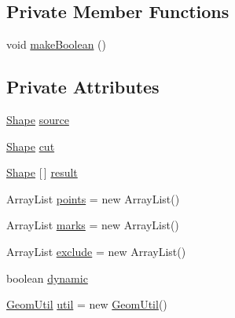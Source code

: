 \subsection*{Private Member Functions}
\begin{DoxyCompactItemize}
\item 
void \mbox{\hyperlink{classorg_1_1newdawn_1_1slick_1_1tests_1_1_geom_util_test_a8e0c0356060376434cac5a5740a2ad01}{make\+Boolean}} ()
\end{DoxyCompactItemize}
\subsection*{Private Attributes}
\begin{DoxyCompactItemize}
\item 
\mbox{\hyperlink{classorg_1_1newdawn_1_1slick_1_1geom_1_1_shape}{Shape}} \mbox{\hyperlink{classorg_1_1newdawn_1_1slick_1_1tests_1_1_geom_util_test_a608f7ccfa180e1e71c5939b8ef38c1fa}{source}}
\item 
\mbox{\hyperlink{classorg_1_1newdawn_1_1slick_1_1geom_1_1_shape}{Shape}} \mbox{\hyperlink{classorg_1_1newdawn_1_1slick_1_1tests_1_1_geom_util_test_abb232621689f77335ad9a620f991adf8}{cut}}
\item 
\mbox{\hyperlink{classorg_1_1newdawn_1_1slick_1_1geom_1_1_shape}{Shape}} \mbox{[}$\,$\mbox{]} \mbox{\hyperlink{classorg_1_1newdawn_1_1slick_1_1tests_1_1_geom_util_test_af4ae92e561e02a091075109486da4a61}{result}}
\item 
Array\+List \mbox{\hyperlink{classorg_1_1newdawn_1_1slick_1_1tests_1_1_geom_util_test_ac17af1067ad6fc4f5e0d55ba2e6435d5}{points}} = new Array\+List()
\item 
Array\+List \mbox{\hyperlink{classorg_1_1newdawn_1_1slick_1_1tests_1_1_geom_util_test_a316d1f8e9dcf90bc91c007a42184cd37}{marks}} = new Array\+List()
\item 
Array\+List \mbox{\hyperlink{classorg_1_1newdawn_1_1slick_1_1tests_1_1_geom_util_test_ae81ed2cbfad947c569f76bdf2ec73da7}{exclude}} = new Array\+List()
\item 
boolean \mbox{\hyperlink{classorg_1_1newdawn_1_1slick_1_1tests_1_1_geom_util_test_a0bffc06cdb831df52228d5124284a9a5}{dynamic}}
\item 
\mbox{\hyperlink{classorg_1_1newdawn_1_1slick_1_1geom_1_1_geom_util}{Geom\+Util}} \mbox{\hyperlink{classorg_1_1newdawn_1_1slick_1_1tests_1_1_geom_util_test_a4ba7fef7b2f6d71b04fdb6c3d8de1adf}{util}} = new \mbox{\hyperlink{classorg_1_1newdawn_1_1slick_1_1geom_1_1_geom_util}{Geom\+Util}}()

\end{DoxyCompactItemize}
